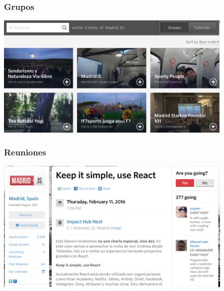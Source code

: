 \begin{frame}
\frametitle{Grupos}

\includegraphics[width=11.5cm]{figs/meetup-near-madrid} 

\end{frame}

\begin{frame}
\frametitle{Reuniones}

\includegraphics[width=11.5cm]{figs/meetup-meeting} 

\end{frame}






